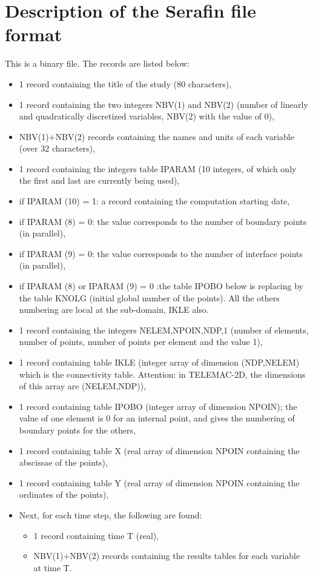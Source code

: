 \chapter{Description of the Serafin file format}
This is a binary file.
The records are listed below:
\begin{itemize}
\item 1 record containing the title of the study (80 characters),
\item 1 record containing the two integers NBV(1) and NBV(2) (number of
linearly and quadratically discretized variables, NBV(2) with the value of 0),
\item NBV(1)+NBV(2) records containing the names and units of each variable
(over 32 characters),
\item 1 record containing the integers table IPARAM (10 integers, of which only
the first and last are currently being used),
\item if IPARAM (10) = 1: a record containing the computation starting date,
\item if IPARAM (8) = 0: the value corresponds to the number of boundary points (in parallel),
\item if IPARAM (9) = 0: the value corresponds to the number of interface points (in parallel),
\item if IPARAM (8) or IPARAM (9) = 0 :the table IPOBO below is replacing by
the table KNOLG (initial global number of the points). All the others numbering
are local at the sub-domain, IKLE also.
\item 1 record containing the integers NELEM,NPOIN,NDP,1 (number of elements,
number of points, number of points per element and the value 1),
\item 1 record containing table IKLE (integer array of dimension (NDP,NELEM)
which is the connectivity table. Attention: in TELEMAC-2D, the dimensions of
this array are (NELEM,NDP)),
\item 1 record containing table IPOBO (integer array of dimension NPOIN); the
value of one element is 0 for an internal point, and gives the numbering of
boundary points for the others,
\item 1 record containing table X (real array of dimension NPOIN containing the
abscissae of the points),
\item 1 record containing table Y (real array of dimension NPOIN containing the
ordinates of the points),
\item Next, for each time step, the following are found:
\begin{itemize}
\item 1 record containing time T (real),
\item NBV(1)+NBV(2) records containing the results tables for each variable at
time T.
\end{itemize}
\end{itemize}




